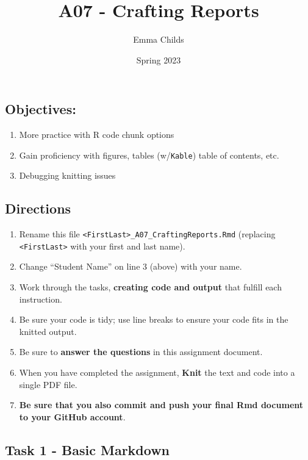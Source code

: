 \documentclass[
]{article}
\title{A07 - Crafting Reports}
\author{Emma Childs}
\date{Spring 2023}
\providecommand{\tightlist}{%
  \setlength{\itemsep}{0pt}\setlength{\parskip}{0pt}}
\begin{document}
\maketitle

{
\setcounter{tocdepth}{3}
\tableofcontents
}
\hypertarget{objectives}{%
\subsection{Objectives:}\label{objectives}}

\begin{enumerate}
\def\labelenumi{\arabic{enumi}.}
\tightlist
\item
  More practice with R code chunk options
\item
  Gain proficiency with figures, tables (w/\texttt{Kable}) table of
  contents, etc.
\item
  Debugging knitting issues
\end{enumerate}

\hypertarget{directions}{%
\subsection{Directions}\label{directions}}

\begin{enumerate}
\def\labelenumi{\arabic{enumi}.}
\tightlist
\item
  Rename this file
  \texttt{\textless{}FirstLast\textgreater{}\_A07\_CraftingReports.Rmd}
  (replacing \texttt{\textless{}FirstLast\textgreater{}} with your first
  and last name).
\item
  Change ``Student Name'' on line 3 (above) with your name.
\item
  Work through the tasks, \textbf{creating code and output} that fulfill
  each instruction.
\item
  Be sure your code is tidy; use line breaks to ensure your code fits in
  the knitted output.
\item
  Be sure to \textbf{answer the questions} in this assignment document.
\item
  When you have completed the assignment, \textbf{Knit} the text and
  code into a single PDF file.
\item
  \textbf{Be sure that you also commit and push your final Rmd document
  to your GitHub account}.
\end{enumerate}

\hypertarget{task-1---basic-markdown}{%
\subsection{Task 1 - Basic Markdown}\label{task-1---basic-markdown}}
\end{document}
